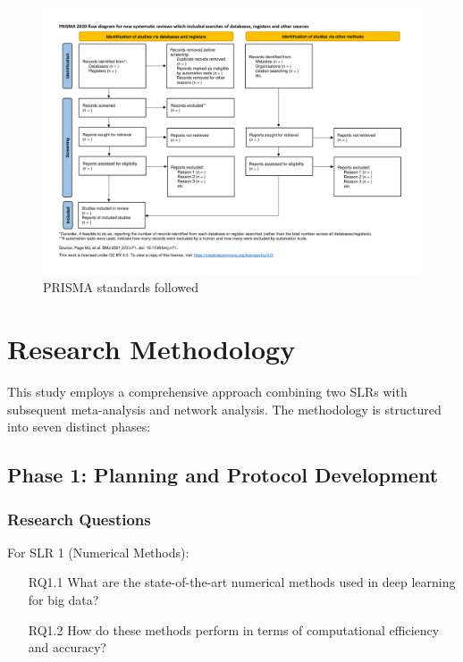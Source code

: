 \documentclass[acmsmall]{acmart}
\begin{document}
\begin{landscape}
    \begin{figure}
        \centering
        \includegraphics[height=0.9\textwidth]{media/flow-diagram.png}
        \caption{PRISMA standards followed}
        \label{fig:prisma-standards}
    \end{figure}
\end{landscape}

\section{Research Methodology}\label{sec:research-methodology}
This study employs a comprehensive approach combining two SLRs with subsequent meta-analysis and network analysis. The methodology is structured into seven distinct phases:

\subsection{Phase 1: Planning and Protocol Development}\label{subsec:phase-1-planning-and-protocol-development}
\subsubsection{Research Questions}\label{subsubsec:phase-1-planning-and-protocol-development:research-questions}
For SLR 1 (Numerical Methods):
\begin{enumerate}
    \item[RQ1.1] What are the state-of-the-art numerical methods used in deep learning for big data?
    \item[RQ1.2] How do these methods perform in terms of computational efficiency and accuracy?
\end{enumerate}
\end{document}
